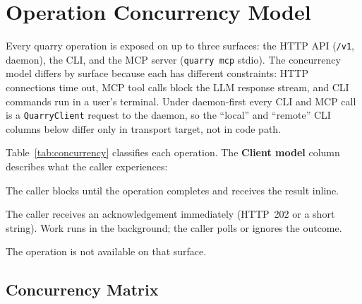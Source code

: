 \documentclass[a4paper,10pt]{article}
\begin{document}
\section{Operation Concurrency Model}
\label{app:concurrency}

Every quarry operation is exposed on up to three surfaces: the HTTP
API (\texttt{/v1}, daemon), the CLI, and the MCP server (\texttt{quarry
mcp} stdio).  The concurrency model differs by surface because each has
different constraints: HTTP connections time out, MCP tool calls block
the LLM response stream, and CLI commands run in a user's terminal.
Under daemon-first every CLI and MCP call is a \texttt{QuarryClient}
request to the daemon, so the ``local'' and ``remote'' CLI columns below
differ only in transport target, not in code path.

Table~\ref{tab:concurrency} classifies each operation.  The
\textbf{Client model} column describes what the caller experiences:

\begin{description}[style=nextline,leftmargin=2.5cm]
  \item[sync] The caller blocks until the operation completes and
    receives the result inline.
  \item[fire-and-forget] The caller receives an acknowledgement
    immediately (HTTP~202 or a short string).  Work runs in the
    background; the caller polls or ignores the outcome.
  \item[---] The operation is not available on that surface.
\end{description}

\subsection{Concurrency Matrix}
\end{document}

